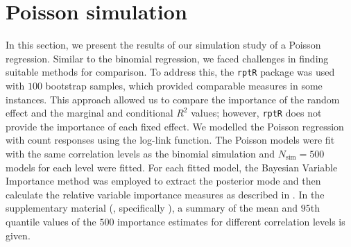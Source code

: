\section{Poisson simulation}
In this section, we present the results of our simulation study of a Poisson regression. Similar to the binomial regression, we faced challenges in finding suitable methods for comparison. To address this, the \texttt{rptR} package was used with $100$ bootstrap samples, which provided comparable measures in some instances. This approach allowed us to compare the importance of the random effect and the marginal and conditional \( R^2 \) values; however, \texttt{rptR} does not provide the importance of each fixed effect. We modelled the Poisson regression with count responses using the log-link function. The Poisson models were fit with the same correlation levels as the binomial simulation and $N_{\text{sim}}=500$ models for each level were fitted. For each fitted model, the Bayesian Variable Importance method was employed to extract the posterior mode and then calculate the relative variable importance measures as described in . In the supplementary material (, specifically ), a summary of the mean and $95$th quantile values of the $500$ importance estimates for different correlation levels is given.
